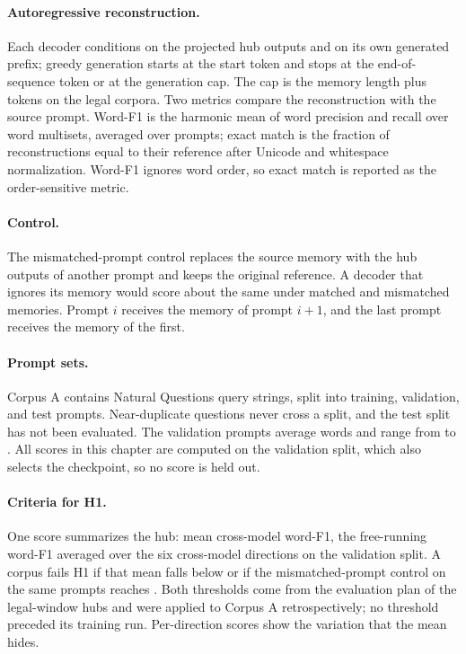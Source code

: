 \paragraph{Autoregressive reconstruction.}
Each decoder conditions on the projected hub outputs and on its own generated prefix; greedy generation starts at the start token and stops at the end-of-sequence token or at the generation cap. 
The cap is the memory length plus  tokens on the legal corpora.
Two metrics compare the reconstruction with the source prompt.
Word-F1 is the harmonic mean of word precision and recall over word multisets, averaged over prompts; exact match is the fraction of reconstructions equal to their reference after Unicode and whitespace normalization. 
Word-F1 ignores word order, so exact match is reported as the order-sensitive metric.

\paragraph{Control.} The mismatched-prompt control replaces the source memory with the hub outputs of another prompt and keeps the original reference.
A decoder that ignores its memory would score about the same under matched and mismatched memories.
Prompt $i$ receives the memory of prompt $i+1$, and the last prompt receives the memory of the first.

\paragraph{Prompt sets.} Corpus A contains Natural Questions query strings, split into  training,  validation, and  test prompts.
Near-duplicate questions never cross a split, and the test split has not been evaluated. %
The validation prompts average  words and range from  to . %
All scores in this chapter are computed on the validation split, which also selects the checkpoint, so no score is held out.

\paragraph{Criteria for H1.} One score summarizes the hub: mean cross-model word-F1, the free-running word-F1 averaged over the six cross-model directions on the validation split.
A corpus fails H1 if that mean falls below  or if the mismatched-prompt control on the same prompts reaches .
Both thresholds come from the evaluation plan of the legal-window hubs and were applied to Corpus A retrospectively; no threshold preceded its training run. %
Per-direction scores show the variation that the mean hides.

